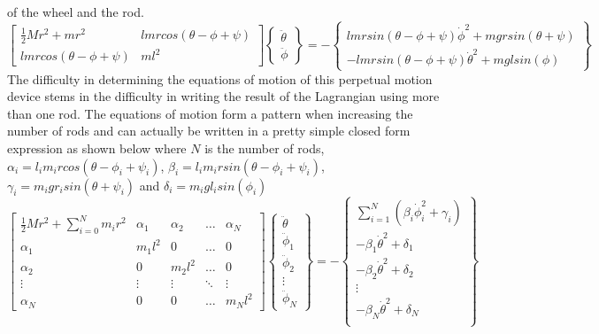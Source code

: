 \documentclass[]{aiaa-tc} %
\begin{document}
of the wheel and the rod. 
\begin{equation}
  \begin{bmatrix} \frac{1}{2}Mr^2 + mr^2 & l m r cos(\theta-\phi+\psi)
    \\ l m r cos(\theta-\phi+\psi) & m
    l^2 \end{bmatrix}\begin{Bmatrix} \ddot{\theta}
    \\ \ddot{\phi} \end{Bmatrix} = -\begin{Bmatrix} l m r sin(\theta-\phi+\psi) \dot{\phi}^2 + m g r
    sin(\theta+\psi) \\ -l m r
    sin(\theta-\phi+\psi)\dot{\theta}^2 + m g l
    sin(\phi) \end{Bmatrix}
\end{equation}
The difficulty in determining the equations of motion of this
perpetual motion device stems in the difficulty in writing the result
of the Lagrangian using more than one rod. The equations of motion
form a pattern when increasing the number of rods and can actually be
written in a pretty simple closed form expression as shown below where
$N$ is the number of rods,
$\alpha_i = l_im_ircos(\theta-\phi_i+\psi_i)$, $\beta_i =
l_im_irsin(\theta-\phi_i+\psi_i)$, $\gamma_i=m_igr_isin(\theta+\psi_i)$
and $\delta_i = m_igl_isin(\phi_i)$
\begin{equation}
  \begin{bmatrix} \frac{1}{2}Mr^2 + \sum\limits_{i=0}^Nm_ir^2 & \alpha_1 & \alpha_2 & \hdots & \alpha_N \\
    \alpha_1 & m_1l^2 & 0 & \hdots & 0\\
    \alpha_2 & 0 & m_2l^2 & \hdots & 0\\
    \vdots & \vdots & \vdots  & \ddots & \vdots \\
    \alpha_N & 0 & 0 & \hdots &
    m_Nl^2  \end{bmatrix}\begin{Bmatrix}\ddot{\theta} \\ \ddot{\phi}_1
    \\ \ddot{\phi}_2 \\ \vdots \\ \ddot{\phi}_N  \end{Bmatrix}
  = -\begin{Bmatrix} \sum\limits_{i=1}^N\left(\beta_i\dot{\phi}_i^2 + \gamma_i\right) \\
    -\beta_1\dot{\theta}^2 + \delta_1 \\
    -\beta_2\dot{\theta}^2 + \delta_2 \\
    \vdots \\
    -\beta_N\dot{\theta}^2 + \delta_N \\
  \end{Bmatrix}
\end{equation}
\end{document}
